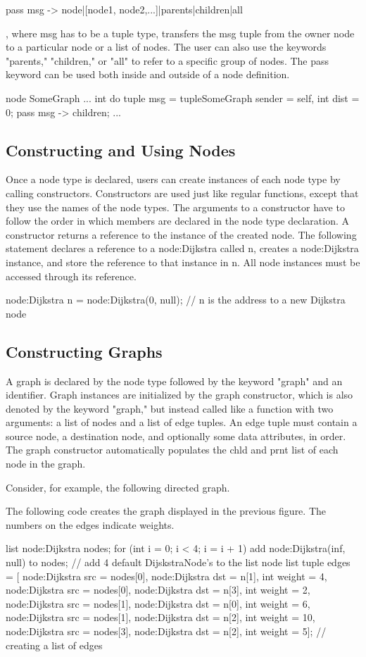 \documentclass{article}
\begin{document}
pass msg -> {node|[node1, node2,...]|parents|children|all}

, where msg has to be a tuple type, transfers the msg tuple from the owner node to a particular node or a list of nodes. The user can also use the keywords "parents," "children," or "all" to refer to a specific group of nodes. The pass keyword can be used both inside and outside of a node definition.

node SomeGraph{
	...
	int do{
tuple msg = tuple{SomeGraph sender = self, int dist = 0};
pass msg -> children;
}
...}
\subsection{Constructing and Using Nodes}
Once a node type is declared, users can create instances of each node type by calling constructors. Constructors are used just like regular functions, except that they use the names of the node types. The arguments to a constructor have to follow the order in which members are declared in the node type declaration. A constructor returns a reference to the instance of the created node. The following statement declares a reference to a node:Dijkstra called n, creates a node:Dijkstra instance, and store the reference to that instance in n. All node instances must be accessed through its reference.

node:Dijkstra n = node:Dijkstra(0, null); // n is the address to a new Dijkstra node
\subsection{Constructing Graphs}
A graph is declared by the node type followed by the keyword "graph" and an identifier. Graph instances are initialized by the graph constructor, which is also denoted by the keyword "graph," but instead called like a function with two arguments: a list of nodes and a list of edge tuples. An edge tuple must contain a source node, a destination node, and optionally some data attributes, in order. The graph constructor automatically populates the chld and prnt list of each node in the graph.

Consider, for example, the following directed graph.

The following code creates the graph displayed in the previous figure. The numbers on the edges indicate weights. 

list node:Dijkstra nodes;
for (int i = 0; i < 4; i = i + 1){
	add node:Dijkstra(inf, null) to nodes; // add 4 default DijskstraNode’s to the list node
}
list tuple edges = [
{node:Dijkstra src = nodes[0], node:Dijkstra dst = n[1], int weight = 4},
{node:Dijkstra src = nodes[0], node:Dijkstra dst = n[3], int weight = 2},
{node:Dijkstra src = nodes[1], node:Dijkstra dst = n[0], int weight = 6},
{node:Dijkstra src = nodes[1], node:Dijkstra dst = n[2], int weight = 10},
{node:Dijkstra src = nodes[3], node:Dijkstra dst = n[2], int weight = 5}]; // creating a list of edges
\end{document}
